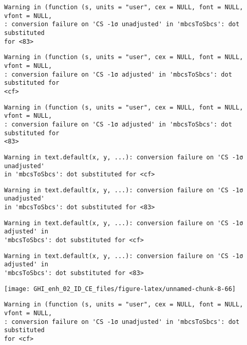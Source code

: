\documentclass[
  10pt,
  a4paper,oneside]{article}
\begin{document}
\begin{verbatim}
Warning in (function (s, units = "user", cex = NULL, font = NULL, vfont = NULL,
: conversion failure on 'CS -1σ unadjusted' in 'mbcsToSbcs': dot substituted
for <83>
\end{verbatim}

\begin{verbatim}
Warning in (function (s, units = "user", cex = NULL, font = NULL, vfont = NULL,
: conversion failure on 'CS -1σ adjusted' in 'mbcsToSbcs': dot substituted for
<cf>
\end{verbatim}

\begin{verbatim}
Warning in (function (s, units = "user", cex = NULL, font = NULL, vfont = NULL,
: conversion failure on 'CS -1σ adjusted' in 'mbcsToSbcs': dot substituted for
<83>
\end{verbatim}

\begin{verbatim}
Warning in text.default(x, y, ...): conversion failure on 'CS -1σ unadjusted'
in 'mbcsToSbcs': dot substituted for <cf>
\end{verbatim}

\begin{verbatim}
Warning in text.default(x, y, ...): conversion failure on 'CS -1σ unadjusted'
in 'mbcsToSbcs': dot substituted for <83>
\end{verbatim}

\begin{verbatim}
Warning in text.default(x, y, ...): conversion failure on 'CS -1σ adjusted' in
'mbcsToSbcs': dot substituted for <cf>
\end{verbatim}

\begin{verbatim}
Warning in text.default(x, y, ...): conversion failure on 'CS -1σ adjusted' in
'mbcsToSbcs': dot substituted for <83>
\end{verbatim}

\begin{center}\texttt{[image: GHI\_enh\_02\_ID\_CE\_files/figure-latex/unnamed-chunk-8-66]} \end{center}

\begin{verbatim}
Warning in (function (s, units = "user", cex = NULL, font = NULL, vfont = NULL,
: conversion failure on 'CS -1σ unadjusted' in 'mbcsToSbcs': dot substituted
for <cf>
\end{verbatim}
\end{document}
